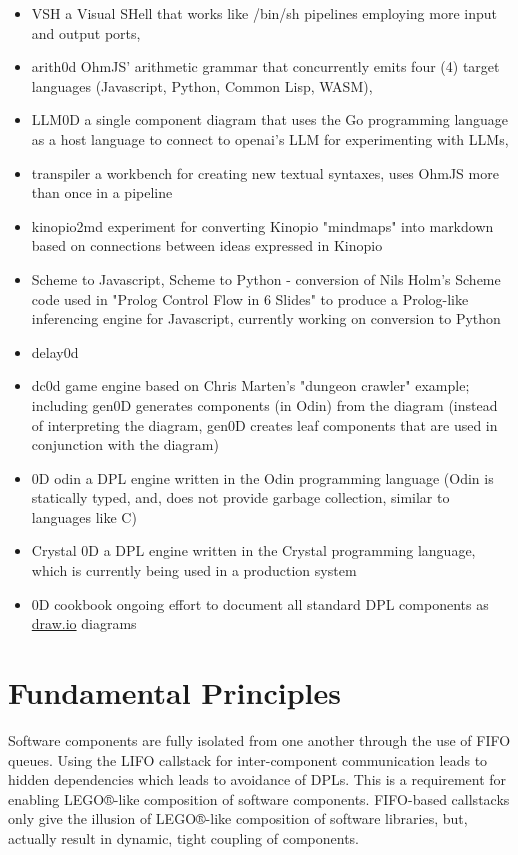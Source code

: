\documentclass[10pt,anonymous,review]{acmart}
\begin{document}
\begin{itemize}
\item VSH\cite{vsh} a Visual SHell that works like /bin/sh pipelines employing more input and output ports,
\item arith0d\cite{arith0d} OhmJS' arithmetic grammar that concurrently emits four (4) target languages (Javascript, Python, Common Lisp, WASM),
\item LLM0D\cite{llm0d} a single component diagram that uses the Go programming language as a host language to connect to openai's LLM for experimenting with LLMs,
\item transpiler\cite{transpiler} a workbench for creating new textual syntaxes, uses OhmJS more than once in a pipeline
\item kinopio2md\cite{k2m} experiment for converting Kinopio "mindmaps" into markdown based on connections between ideas expressed in Kinopio
\item Scheme to Javascript\cite{scm2js}, Scheme to Python\cite{scm2py} - conversion of Nils Holm's Scheme code used in "Prolog Control Flow in 6 Slides" to produce a Prolog-like inferencing engine for Javascript, currently working on conversion to Python
\item delay0d\cite{delay0d}
\item dc0d\cite{dc0d} game engine based on Chris Marten's "dungeon crawler" example\cite{ceptre_paper}; including gen0D generates components (in Odin) from the diagram (instead of interpreting the diagram, gen0D creates leaf components that are used in conjunction with the diagram)
\item 0D odin\cite{odin0d} a DPL engine written in the Odin programming language (Odin is statically typed, and, does not provide garbage collection, similar to languages like C)
\item Crystal 0D\cite{crystal0d} a DPL engine written in the Crystal programming language, which is currently being used in a production system
\item 0D cookbook\cite{0dcookbook} ongoing effort to document all standard DPL components as \href{http://draw.io}{draw.io} diagrams
\end{itemize}

\section{Fundamental Principles}
Software components are fully isolated from one another through the use
of FIFO queues. Using the LIFO callstack for inter-component
communication leads to hidden dependencies which leads to avoidance of
DPLs. This is a requirement for enabling LEGO®-like composition of software components.
FIFO-based callstacks only give the illusion of LEGO®-like composition of software libraries,
but, actually result in dynamic, tight coupling of components.
\end{document}
